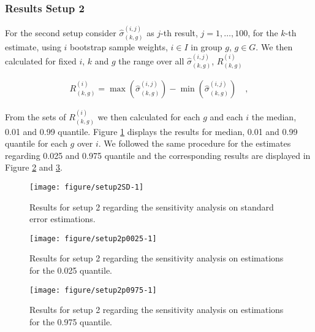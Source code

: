 \documentclass{scrartcl}\usepackage[]{graphicx}\usepackage[]{color}
\makeatletter
\def\maxwidth{ %
  \ifdim\Gin@nat@width>\linewidth
    \linewidth
  \else
    \Gin@nat@width
  \fi
}
\newenvironment{knitrout}{}{} %
\makeatother
\begin{document}
\subsubsection{Results Setup 2}
For the second setup consider $\hat{\sigma}^{(i,j)}_{(k,g)}$ as $j$-th result, $j=1,\ldots,100$, for the $k$-th estimate, using $i$ bootstrap sample weights, $i\in I$ in group $g$, $g\in G$. We then calculated for fixed $i$, $k$ and $g$ the range over all $\hat{\sigma}^{(i,j)}_{(k,g)}$, $R^{(i)}_{(k,g)}$

\begin{align*}
  R^{(i)}_{(k,g)} = \max(\hat{\sigma}^{(i,j)}_{(k,g)}) - \min(\hat{\sigma}^{(i,j)}_{(k,g)}) \quad,
\end{align*}

From the sets of $R^{(i)}_{(k,g)}$ we then calculated for each $g$ and each $i$ the median, 0.01 and 0.99 quantile.
Figure \ref{fig:setup2SD} displays the results for median, 0.01 and 0.99 quantile for each $g$ over $i$. We followed the same procedure for the estimates regarding 0.025 and 0.975 quantile and the corresponding results are displayed in Figure \ref{fig:setup2p0025} and \ref{fig:setup2p0975}.



\begin{knitrout}
\color{fgcolor}\begin{figure}
\texttt{[image: figure/setup2SD-1]} \caption[Results for setup 2 regarding the sensitivity analysis on standard error estimations]{Results for setup 2 regarding the sensitivity analysis on standard error estimations.}\label{fig:setup2SD}
\end{figure}


\end{knitrout}


\begin{knitrout}
\color{fgcolor}\begin{figure}
\texttt{[image: figure/setup2p0025-1]} \caption[Results for setup 2 regarding the sensitivity analysis on estimations for the 0.025 quantile]{Results for setup 2 regarding the sensitivity analysis on estimations for the 0.025 quantile.}\label{fig:setup2p0025}
\end{figure}


\end{knitrout}

\begin{knitrout}
\color{fgcolor}\begin{figure}
\texttt{[image: figure/setup2p0975-1]} \caption[Results for setup 2 regarding the sensitivity analysis on estimations for the 0.975 quantile]{Results for setup 2 regarding the sensitivity analysis on estimations for the 0.975 quantile.}\label{fig:setup2p0975}
\end{figure}


\end{knitrout}
\end{document}
